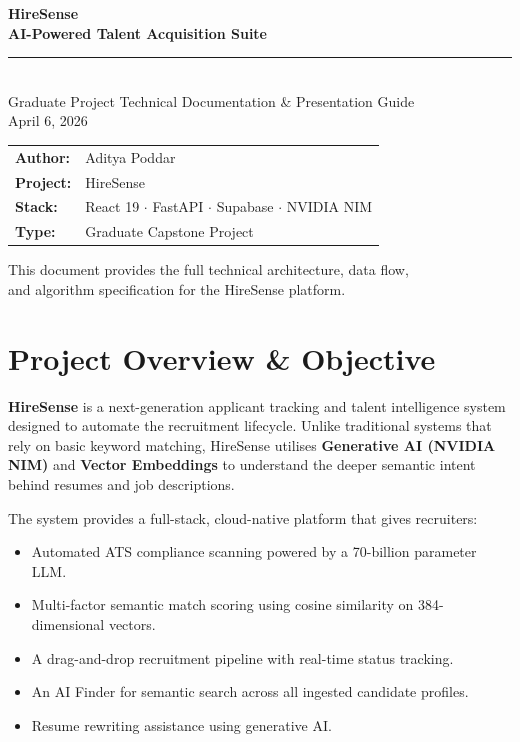 \documentclass[12pt, a4paper]{article}
\newcommand{\highlight}[1]{\textcolor{primary}{\textbf{#1}}}
\begin{document}

\begin{titlepage}
\centering
\vspace*{3cm}
{\Huge\bfseries\color{primary} HireSense}\\[0.4cm]
{\Large\bfseries\color{headergray} AI-Powered Talent Acquisition Suite}\\[1cm]
\noindent\textcolor{primary}{\rule{0.6\linewidth}{1.5pt}}\\[1cm]
{\large Graduate Project Technical Documentation \& Presentation Guide}\\[0.5cm]
{\normalsize\color{headergray} April 6, 2026}\\[2cm]
\begin{tabular}{ll}
    \textbf{Author:}  & Aditya Poddar \\[4pt]
    \textbf{Project:} & HireSense \\[4pt]
    \textbf{Stack:}   & React 19 $\cdot$ FastAPI $\cdot$ Supabase $\cdot$ NVIDIA NIM \\[4pt]
    \textbf{Type:}    & Graduate Capstone Project \\
\end{tabular}
\vfill
\textcolor{headergray}{\small This document provides the full technical architecture, data flow,\\
and algorithm specification for the HireSense platform.}
\end{titlepage}

\tableofcontents
\newpage

\section{Project Overview \& Objective}

\highlight{HireSense} is a next-generation applicant tracking and talent intelligence system designed to automate the recruitment lifecycle. Unlike traditional systems that rely on basic keyword matching, HireSense utilises \highlight{Generative AI (NVIDIA NIM)} and \highlight{Vector Embeddings} to understand the deeper semantic intent behind resumes and job descriptions.

The system provides a full-stack, cloud-native platform that gives recruiters:
\begin{itemize}[noitemsep]
    \item Automated ATS compliance scanning powered by a 70-billion parameter LLM.
    \item Multi-factor semantic match scoring using cosine similarity on 384-dimensional vectors.
    \item A drag-and-drop recruitment pipeline with real-time status tracking.
    \item An AI Finder for semantic search across all ingested candidate profiles.
    \item Resume rewriting assistance using generative AI.
\end{itemize}
\end{document}
